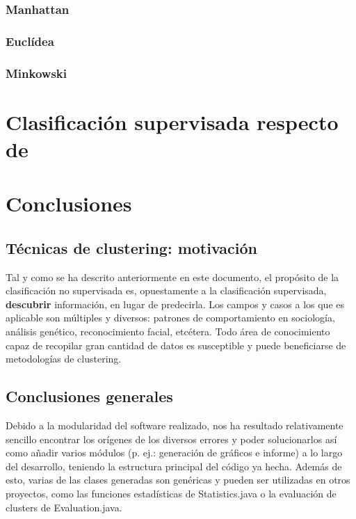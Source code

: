 \documentclass[10pt,a4paper]{article}
\begin{document}
\subsubsection{Manhattan}

\subsubsection{Euclídea}

\subsubsection{Minkowski}

\section{Clasificación supervisada respecto de }




\section{Conclusiones}

\subsection{Técnicas de clustering: motivación}

Tal y como se ha descrito anteriormente en este documento, el propósito de la
clasificación no supervisada es, opuestamente a la clasificación supervisada,
\textbf{descubrir} información, en lugar de predecirla. Los campos y casos a los
que es aplicable son múltiples y diversos: patrones de comportamiento en
sociología, análisis genético, reconocimiento facial, etcétera. Todo área de
conocimiento capaz de recopilar gran cantidad de datos es susceptible y puede
beneficiarse de metodologías de clustering.


\subsection{Conclusiones generales}

Debido a la modularidad del software realizado, nos ha resultado relativamente
sencillo encontrar los orígenes de los diversos errores y poder solucionarlos
así como añadir varios módulos (p. ej.:
generación de gráficos e informe) a lo largo del desarrollo, teniendo la
estructura principal del código ya hecha. Además de esto, varias de las clases
generadas son genéricas y pueden ser utilizadas en otros proyectos, como las 
funciones estadísticas de Statistics.java o la evaluación de clusters de Evaluation.java.\\
\end{document}
